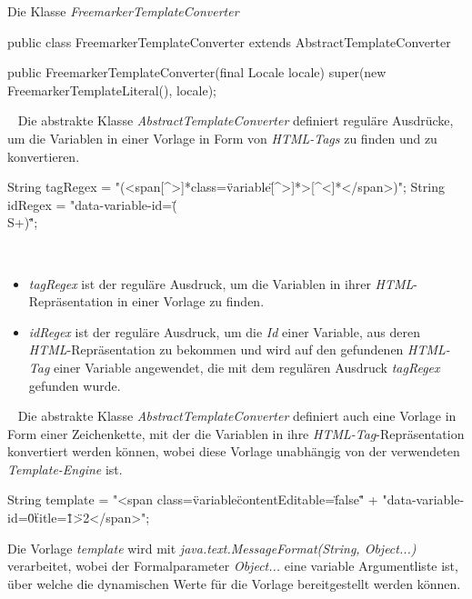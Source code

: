\begin{program}[h]
\caption{Die Klasse \emph{FreemarkerTemplateConverter}}
\label{prog:freemarkerTemplateConverter}
\begin{JavaCode}
public class FreemarkerTemplateConverter 
                          extends AbstractTemplateConverter {

    public FreemarkerTemplateConverter(final Locale locale) {
        super(new FreemarkerTemplateLiteral(), locale);
    }
}
\end{JavaCode}
\end{program}
\ 
\newline
Die abstrakte Klasse \emph{AbstractTemplateConverter} definiert reguläre Ausdrücke, um die Variablen in einer Vorlage in Form von \emph{HTML-Tags} zu finden und zu konvertieren.
\begin{JavaCode}[numbers=none]
String tagRegex = "(<span[^>]*class=\"variable\"[^>]*>[^<]*</span>)";
String idRegex  = "data-variable-id=\"(\\S+)\"";
\end{JavaCode}
\ \begin{itemize}
	\item\emph{tagRegex}
	\newline
	ist der reguläre Ausdruck, um die Variablen in ihrer \emph{HTML}-Repräsentation in einer Vorlage zu finden.
	\item\emph{idRegex}
	\newline
	ist der reguläre Ausdruck, um die \emph{Id} einer Variable, aus deren \emph{HTML}-Repräsentation zu bekommen und wird auf den gefundenen \emph{HTML-Tag} einer Variable angewendet, die mit dem regulären Ausdruck \emph{tagRegex} gefunden wurde.
\end{itemize}
\ \newline
Die abstrakte Klasse \emph{AbstractTemplateConverter} definiert auch eine Vorlage in Form einer Zeichenkette, mit der die Variablen in ihre \emph{HTML-Tag}-Repräsentation konvertiert werden können, wobei diese Vorlage unabhängig von der verwendeten \emph{Template-Engine} ist.
\begin{JavaCode}
String template = "<span class=\"variable\" contentEditable=\"false\" "
                + "data-variable-id=\"{0}\" title=\"{1}\">{2}</span>";
\end{JavaCode}
Die Vorlage \emph{template} wird mit \emph{java.text.MessageFormat(String, Object...)} verarbeitet, wobei der Formalparameter \emph{Object...} eine variable Argumentliste ist, über welche die dynamischen Werte für die Vorlage bereitgestellt werden können. 


